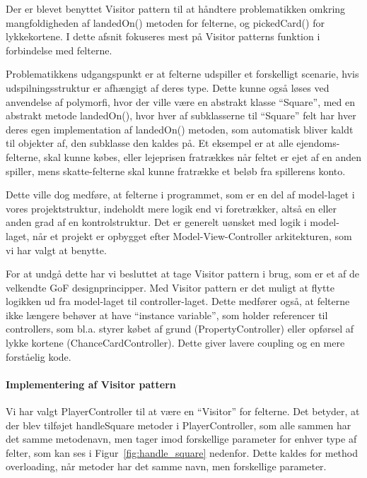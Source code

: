 \documentclass[class=article, crop=false]{standalone}
\begin{document}
        Der er blevet benyttet Visitor pattern til at håndtere problematikken omkring mangfoldigheden af landedOn() metoden for felterne, og pickedCard() for lykkekortene. I dette afsnit fokuseres mest på Visitor patterns funktion i forbindelse med felterne. \par
        Problematikkens udgangspunkt er at felterne udspiller et forskelligt scenarie, hvis udspilningsstruktur er afhængigt af deres type. Dette kunne også løses ved anvendelse af polymorfi, hvor der ville være en abstrakt klasse “Square”, med en abstrakt metode landedOn(), hvor hver af subklasserne til “Square” felt har hver deres egen implementation af landedOn() metoden, som automatisk bliver kaldt til objekter af, den subklasse den kaldes på. Et eksempel er at alle ejendoms-felterne, skal kunne købes, eller lejeprisen fratrækkes når feltet er ejet af en anden spiller, mens skatte-felterne skal kunne fratrække et beløb fra spillerens konto. \par
        Dette ville dog medføre, at felterne i programmet, som er en del af model-laget i vores projektstruktur, indeholdt mere logik end vi foretrækker, altså en eller anden grad af en kontrolstruktur. Det er generelt uønsket med logik i model-laget, når et projekt er opbygget efter Model-View-Controller arkitekturen, som vi har valgt at benytte. \par
        For at undgå dette har vi besluttet at tage Visitor pattern i brug, som er et af de velkendte GoF designprincipper. Med Visitor pattern er det muligt at flytte logikken ud fra model-laget til controller-laget. Dette medfører også, at felterne ikke længere behøver at have “instance variable”, som holder referencer til controllers, som bl.a. styrer købet af grund (PropertyController) eller opførsel af lykke kortene (ChanceCardController). Dette giver lavere coupling og en mere forståelig kode.\par
\paragraph{Implementering af Visitor pattern \newline}
        Vi har valgt PlayerController til at være en “Visitor” for felterne. Det betyder, at der blev tilføjet handleSquare metoder i PlayerController, som alle sammen har det samme metodenavn, men tager imod forskellige parameter for enhver type af felter, som kan ses i Figur~\ref{fig:handle_square} nedenfor. Dette kaldes for method overloading, når metoder har det samme navn, men forskellige parameter.
\end{document}
